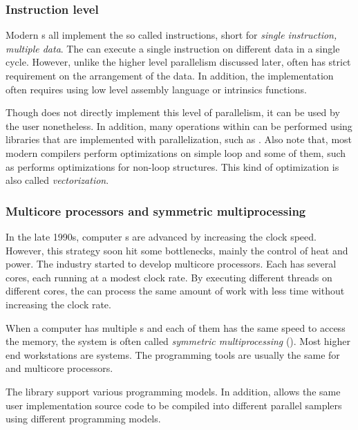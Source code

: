 \subsubsection{Instruction level}
\label{ssub:Instruction level}

Modern \cpu{}s all implement the so called \simd instructions, short for
\emph{single instruction, multiple data}. The \cpu can execute a single
instruction on different data in a single cycle. However, unlike the higher
level parallelism discussed later, \simd often has strict requirement on the
arrangement of the data. In addition, the implementation often requires using
low level assembly language or intrinsics functions.

Though \vsmc does not directly implement this level of parallelism, it can be
used by the user nonetheless. In addition, many operations within \vsmc can be
performed using libraries that are implemented with \simd parallelization,
such as \mkl. Also note that, most modern \cpp compilers perform \simd
optimizations on simple loop and some of them, such as \clang \cite{clang}
performs \simd optimizations for non-loop structures. This kind of
optimization is also called \emph{vectorization}.

\subsubsection{Multicore processors and symmetric multiprocessing}
\label{ssub:Multicore processors and symmetric multiprocessing}

In the late 1990s, computer \cpu{}s are advanced by increasing the clock
speed. However, this strategy soon hit some bottlenecks, mainly the control of
heat and power. The industry started to develop multicore processors. Each
\cpu has several cores, each running at a modest clock rate. By executing
different threads on different cores, the \cpu can process the same amount of
work with less time without increasing the clock rate.

When a computer has multiple \cpu{}s and each of them has the same speed to
access the memory, the system is often called \emph{symmetric multiprocessing}
(\smp). Most higher end workstations are \smp systems. The programming tools
are usually the same for \smp and multicore processors.

The \vsmc library support various \smp programming models. In addition, \vsmc
allows the same user implementation source code to be compiled into different
parallel samplers using different programming models.

